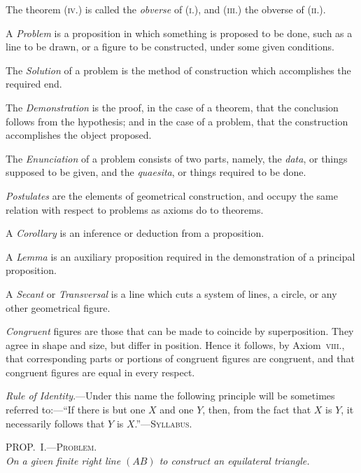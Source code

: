 \documentclass[oneside]{book}
\newcommand\myprop[2]{
\bigskip\Needspace*{4\baselineskip}\begin{center}\textsc{#1}\\\medskip\emph{#2}\par\end{center}
}
\begin{document}
The theorem (\textsc{iv}.) is called the \emph{obverse} of (\textsc{i}.), and
(\textsc{iii}.) the obverse of (\textsc{ii}.).

A \emph{Problem} is a proposition in which something is
proposed to be done, such as a line to be drawn, or a
figure to be constructed, under some given conditions.

The \emph{Solution} of a problem is the method of construction
which accomplishes the required end.

The \emph{Demonstration} is the proof, in the case of a
theorem, that the conclusion follows from the hypothesis;
and in the case of a problem, that the construction
accomplishes the object proposed.

The \emph{Enunciation} of a problem consists of two parts,
namely, the \emph{data}, or things supposed to be given, and
the \emph{quaesita}, or things required to be done.

\emph{Postulates} are the elements of geometrical construction,
and occupy the same relation with respect to
problems as axioms do to theorems.

A \emph{Corollary} is an inference or deduction from a proposition.

A \emph{Lemma} is an auxiliary proposition required in the
demonstration of a principal proposition.

A \emph{Secant} or \emph{Transversal} is a line which cuts a system
of lines, a circle, or any other geometrical figure.

\emph{Congruent} figures are those that can be made to
coincide by superposition. They agree in shape and
size, but differ in position. Hence it follows, by
Axiom~\textsc{viii}., that corresponding parts or portions of
congruent figures are congruent, and that congruent
figures are equal in every respect.

\emph{Rule of Identity}.---Under this name the following
principle will be sometimes referred to:---``If there is
but one $X$ and one $Y$, then, from the fact that $X$ is $Y$,
it necessarily follows that $Y$ is $X$.''---\textsc{Syllabus}.


\myprop{PROP\@.~I.---Problem.}{On a given finite right line $(AB)$ to construct an equilateral triangle.}
\end{document}
